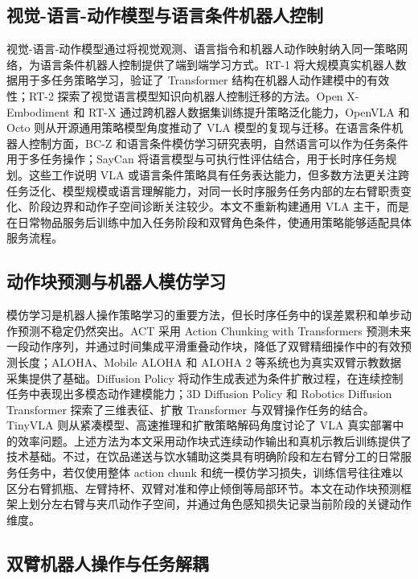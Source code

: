 \documentclass[UTF8,a4paper,zihao=5,scheme=chinese]{ctexart}
\numberwithin{figure}{section}
\numberwithin{table}{section}
\begin{document}
\subsection{视觉-语言-动作模型与语言条件机器人控制}

视觉-语言-动作模型通过将视觉观测、语言指令和机器人动作映射纳入同一策略网络，为语言条件机器人控制提供了端到端学习方式。RT-1 将大规模真实机器人数据用于多任务策略学习，验证了 Transformer 结构在机器人动作建模中的有效性\cite{rt1}；RT-2 探索了视觉语言模型知识向机器人控制迁移的方法\cite{rt2}。Open X-Embodiment 和 RT-X 通过跨机器人数据集训练提升策略泛化能力\cite{openx}，OpenVLA 和 Octo 则从开源通用策略模型角度推动了 VLA 模型的复现与迁移\cite{openvla,octo}。在语言条件机器人控制方面，BC-Z 和语言条件模仿学习研究表明，自然语言可以作为任务条件用于多任务操作\cite{bcz,lcil}；SayCan 将语言模型与可执行性评估结合，用于长时序任务规划\cite{saycan}。这些工作说明 VLA 或语言条件策略具有任务表达能力，但多数方法更关注跨任务泛化、模型规模或语言理解能力，对同一长时序服务任务内部的左右臂职责变化、阶段边界和动作子空间诊断关注较少。本文不重新构建通用 VLA 主干，而是在日常物品服务后训练中加入任务阶段和双臂角色条件，使通用策略能够适配具体服务流程。

\subsection{动作块预测与机器人模仿学习}

模仿学习是机器人操作策略学习的重要方法，但长时序任务中的误差累积和单步动作预测不稳定仍然突出。ACT 采用 Action Chunking with Transformers 预测未来一段动作序列，并通过时间集成平滑重叠动作块，降低了双臂精细操作中的有效预测长度；ALOHA、Mobile ALOHA 和 ALOHA 2 等系统也为真实双臂示教数据采集提供了基础\cite{act,mobilealoha,aloha2}。Diffusion Policy 将动作生成表述为条件扩散过程，在连续控制任务中表现出多模态动作建模能力\cite{diffusionpolicy}；3D Diffusion Policy 和 Robotics Diffusion Transformer 探索了三维表征、扩散 Transformer 与双臂操作任务的结合\cite{dp3,rdt}。TinyVLA 则从紧凑模型、高速推理和扩散策略解码角度讨论了 VLA 真实部署中的效率问题\cite{tinyvla}。上述方法为本文采用动作块式连续动作输出和真机示教后训练提供了技术基础。不过，在饮品递送与饮水辅助这类具有明确阶段和左右臂分工的日常服务任务中，若仅使用整体 action chunk 和统一模仿学习损失，训练信号往往难以区分右臂抓瓶、左臂持杯、双臂对准和停止倾倒等局部环节。本文在动作块预测框架上划分左右臂与夹爪动作子空间，并通过角色感知损失记录当前阶段的关键动作维度。

\subsection{双臂机器人操作与任务解耦}
\end{document}
